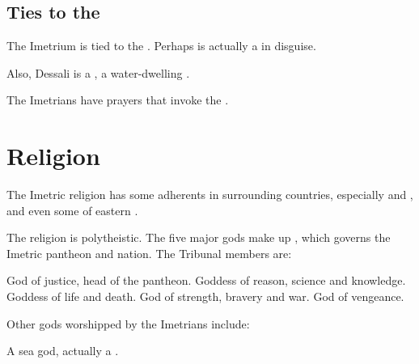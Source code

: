 \subsection{Ties to the \nagae}
The Imetrium is tied to the \nagae. 
Perhaps \Sarokash is actually a \nagalord{} in disguise. 

Also, Dessali is a \naiad, a water-dwelling . 

The Imetrians have prayers that invoke the \nagae. 









\section{Religion}
The Imetric religion has some adherents in surrounding countries, especially  and , and even some of eastern . 

The religion is polytheistic. 
The five major gods make up , which governs the Imetric pantheon and nation. 
The Tribunal members are: 
  
\begin{gloss}
  \gitemlink[Sarokash]{\Sarokash} 
  \index{\Sarokash}
    God of justice, head of the pantheon.
    Goddess of reason, science and knowledge. 
  \index{\NishiS}
    Goddess of life and death. 
    God of strength, bravery and war. 
  \gitemlink[Hiothrex]{\Hiothrex}
  \index{\Hiothrex}
    God of vengeance. 
\end{gloss}

Other gods worshipped by the Imetrians include: 

\begin{gloss}
  A sea god, actually a \nagalord. 
\end{gloss}





